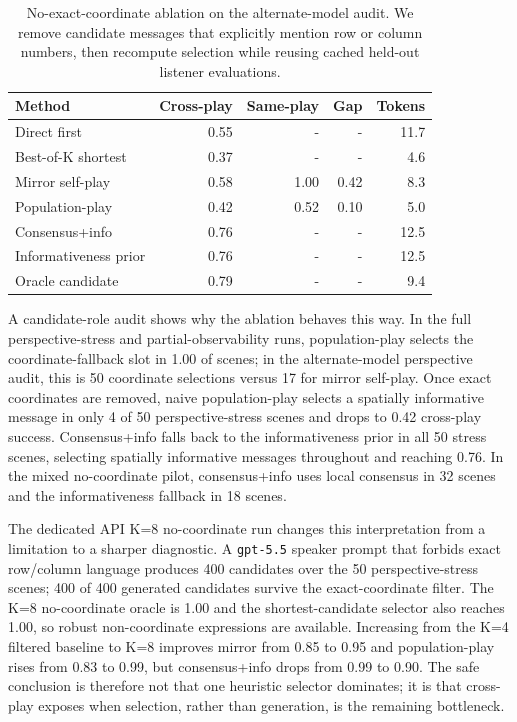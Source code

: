 \documentclass[10pt]{article}
\begin{document}
\begin{table}[H]
\centering
\begin{tabular}{lrrrr}
\toprule
Method & Cross-play & Same-play & Gap & Tokens \\
\midrule
Direct first & 0.55 & - & - & 11.7 \\
Best-of-K shortest & 0.37 & - & - & 4.6 \\
Mirror self-play & 0.58 & 1.00 & 0.42 & 8.3 \\
Population-play & 0.42 & 0.52 & 0.10 & 5.0 \\
Consensus+info & 0.76 & - & - & 12.5 \\
Informativeness prior & 0.76 & - & - & 12.5 \\
Oracle candidate & 0.79 & - & - & 9.4 \\
\bottomrule
\end{tabular}
\caption{No-exact-coordinate ablation on the alternate-model audit. We remove candidate messages that explicitly mention row or column numbers, then recompute selection while reusing cached held-out listener evaluations.}
\label{tab:nocoord}
\end{table}

A candidate-role audit shows why the ablation behaves this way. In the full perspective-stress and partial-observability runs, population-play selects the coordinate-fallback slot in 1.00 of scenes; in the alternate-model perspective audit, this is 50 coordinate selections versus 17 for mirror self-play. Once exact coordinates are removed, naive population-play selects a spatially informative message in only 4 of 50 perspective-stress scenes and drops to 0.42 cross-play success. Consensus+info falls back to the informativeness prior in all 50 stress scenes, selecting spatially informative messages throughout and reaching 0.76. In the mixed no-coordinate pilot, consensus+info uses local consensus in 32 scenes and the informativeness fallback in 18 scenes.

The dedicated API K=8 no-coordinate run changes this interpretation from a limitation to a sharper diagnostic. A \texttt{gpt-5.5} speaker prompt that forbids exact row/column language produces 400 candidates over the 50 perspective-stress scenes; 400 of 400 generated candidates survive the exact-coordinate filter. The K=8 no-coordinate oracle is 1.00 and the shortest-candidate selector also reaches 1.00, so robust non-coordinate expressions are available. Increasing from the K=4 filtered baseline to K=8 improves mirror from 0.85 to 0.95 and population-play rises from 0.83 to 0.99, but consensus+info drops from 0.99 to 0.90. The safe conclusion is therefore not that one heuristic selector dominates; it is that cross-play exposes when selection, rather than generation, is the remaining bottleneck.
\end{document}
